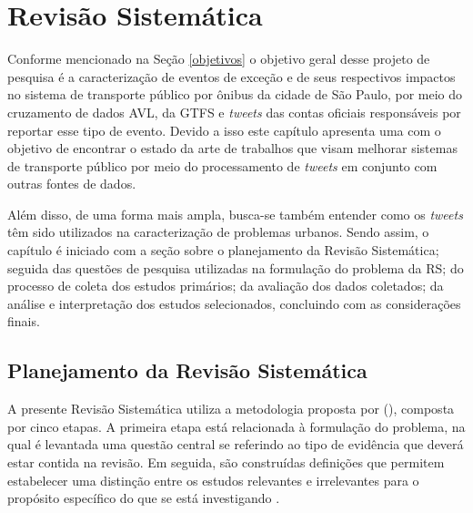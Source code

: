 \documentclass[
	12pt,				%
	oneside,			%
	a4paper,			%
	english,			%
	brazil				%
	]{abntex2ppgsi}
\begin{document}
{{\chapter{Revisão Sistemática}
\label{revisao}
Conforme mencionado na Seção \ref{objetivos} o objetivo geral desse projeto de pesquisa é a caracterização de eventos de exceção e de seus respectivos impactos no sistema de transporte público por ônibus da cidade de São Paulo, por meio do cruzamento de dados AVL, da GTFS e \textit{tweets} das contas oficiais responsáveis por reportar esse tipo de evento. Devido a isso este capítulo apresenta uma  com o objetivo de encontrar o estado da arte de trabalhos que visam melhorar sistemas de transporte público por meio do processamento de \textit{tweets} em conjunto com outras fontes de dados.

Além disso, de uma forma mais ampla, busca-se também entender como os \textit{tweets} têm sido utilizados na caracterização de problemas urbanos. Sendo assim, o capítulo é iniciado com a seção sobre o planejamento da Revisão Sistemática; seguida das questões de pesquisa utilizadas na formulação do problema da RS; do processo de coleta dos estudos primários; da avaliação dos dados coletados; da análise e interpretação dos estudos selecionados, concluindo com as considerações finais.



\section{Planejamento da Revisão Sistemática}
\label{planejamento}
A presente Revisão Sistemática utiliza a metodologia proposta por \citeauthor{biolchini2005techincal} (\citeyear{biolchini2005techincal}), composta por cinco etapas.
A primeira etapa está relacionada à formulação do problema, na qual é levantada uma questão central se referindo ao tipo de evidência que deverá  estar contida na revisão. Em seguida, são construídas definições que permitem estabelecer uma distinção entre os estudos relevantes e irrelevantes para o propósito específico do que se está investigando \cite{biolchini2005techincal}.

}}
\end{document}
